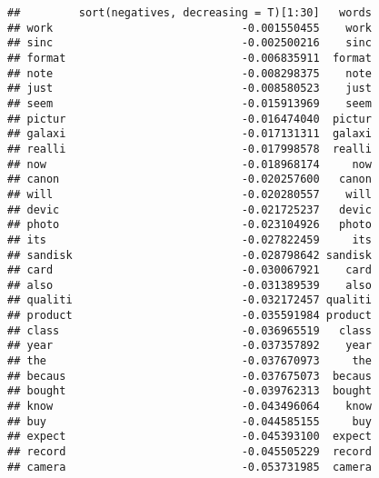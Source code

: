 \documentclass[
]{article}
\newenvironment{Shaded}{\begin{snugshade}}{\end{snugshade}}
\newcommand{\DataTypeTok}[1]{\textcolor[rgb]{0.13,0.29,0.53}{#1}}
\newcommand{\DecValTok}[1]{\textcolor[rgb]{0.00,0.00,0.81}{#1}}
\newcommand{\KeywordTok}[1]{\textcolor[rgb]{0.13,0.29,0.53}{\textbf{#1}}}
\newcommand{\NormalTok}[1]{#1}
\newcommand{\OperatorTok}[1]{\textcolor[rgb]{0.81,0.36,0.00}{\textbf{#1}}}
\newcommand{\StringTok}[1]{\textcolor[rgb]{0.31,0.60,0.02}{#1}}
\begin{document}
\begin{Shaded}
\end{Shaded}

\begin{verbatim}
##         sort(negatives, decreasing = T)[1:30]   words
## work                             -0.001550455    work
## sinc                             -0.002500216    sinc
## format                           -0.006835911  format
## note                             -0.008298375    note
## just                             -0.008580523    just
## seem                             -0.015913969    seem
## pictur                           -0.016474040  pictur
## galaxi                           -0.017131311  galaxi
## realli                           -0.017998578  realli
## now                              -0.018968174     now
## canon                            -0.020257600   canon
## will                             -0.020280557    will
## devic                            -0.021725237   devic
## photo                            -0.023104926   photo
## its                              -0.027822459     its
## sandisk                          -0.028798642 sandisk
## card                             -0.030067921    card
## also                             -0.031389539    also
## qualiti                          -0.032172457 qualiti
## product                          -0.035591984 product
## class                            -0.036965519   class
## year                             -0.037357892    year
## the                              -0.037670973     the
## becaus                           -0.037675073  becaus
## bought                           -0.039762313  bought
## know                             -0.043496064    know
## buy                              -0.044585155     buy
## expect                           -0.045393100  expect
## record                           -0.045505229  record
## camera                           -0.053731985  camera
\end{verbatim}
\end{document}

